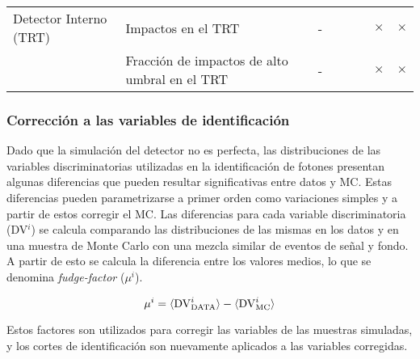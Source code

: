 \begin{table}[!htbp]
\begin{tabular}{y{3cm} p{7cm} c | cc | ccc}
  Detector Interno (TRT)           & Impactos en el TRT                                & -                       &  &   &   & $\times$ & $\times$ \\

                & Fracción de impactos de alto umbral en el TRT     & -                       &  &   &   & $\times$ & $\times$ \\
  \hline
  \end{tabular}

\end{table}



\subsubsection{Corrección a las variables de identificación}


Dado que la simulación del detector no es perfecta, las distribuciones de las variables
discriminatorias utilizadas en la identificación
de fotones presentan algunas diferencias que pueden resultar significativas entre datos y MC.
Estas diferencias pueden parametrizarse a primer orden como variaciones simples
y a partir de estos corregir el MC.
Las diferencias para cada variable discriminatoria (DV$^i$) se calcula
comparando las distribuciones de las mismas en los datos y en una muestra de
Monte Carlo con una mezcla similar de eventos de señal y fondo.
A partir de esto se calcula la diferencia
entre los valores medios, lo que se denomina \emph{fudge-factor} ($\mu^i$)\cite{ATLAS-CONF-2012-123}.

\begin{equation}
  \mu^i = \langle \mathrm{DV}^i_\text{DATA} \rangle - \langle \mathrm{DV}^i_\mathrm{MC} \rangle
\end{equation}

Estos factores son utilizados para corregir las variables de las
muestras simuladas, y los cortes de identificación son nuevamente
aplicados a las variables corregidas.



